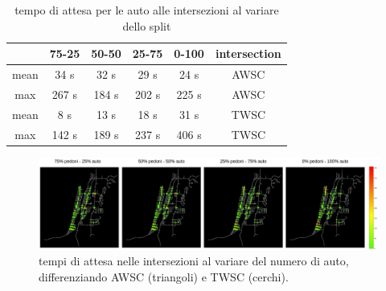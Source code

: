 \begin{table}[h]
    \centering
    \begin{tabular}{|c|c|c|c|c|c|}
    \hline
         & 75-25 & 50-50 & 25-75 & 0-100 & intersection \\ \hline
    mean & 34 s  & 32 s  & 29 s  & 24 s  & AWSC         \\ \hline
    max  & 267 s & 184 s & 202 s & 225 s & AWSC         \\ \hline
    mean & 8 s   & 13 s  & 18 s  & 31 s  & TWSC         \\ \hline
    max  & 142 s & 189 s & 237 s & 406 s & TWSC         \\ \hline
    \end{tabular}
    \caption{tempo di attesa per le auto alle intersezioni al variare dello split}
    \label{tab:analisi-car-delay}
\end{table}


\newpage


\begin{figure}[h]
    \includegraphics[width=1\textwidth]{images/analisi/comparison-car-delay.png}   
    \caption{tempi di attesa nelle intersezioni al variare del numero di auto, differenziando AWSC (triangoli) e TWSC (cerchi).}
    \label{fig:analisi-comparison-car-delay}
\end{figure}

\lipsum[1]

